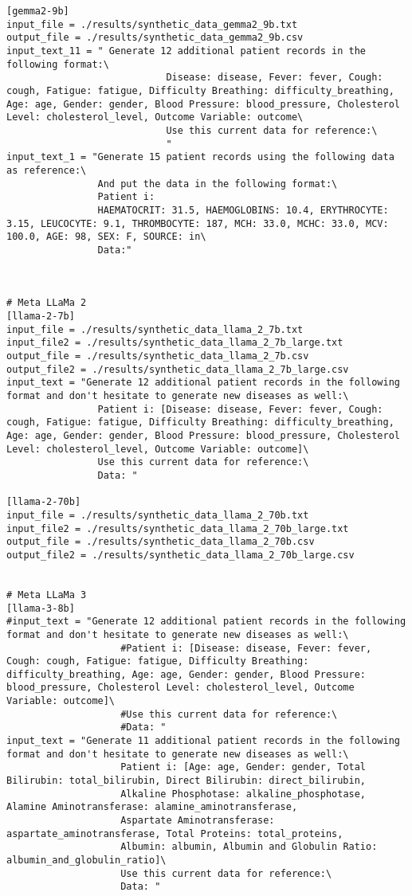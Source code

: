 \begin{verbatim}
[gemma2-9b]
input_file = ./results/synthetic_data_gemma2_9b.txt
output_file = ./results/synthetic_data_gemma2_9b.csv
input_text_11 = " Generate 12 additional patient records in the following format:\
                            Disease: disease, Fever: fever, Cough: cough, Fatigue: fatigue, Difficulty Breathing: difficulty_breathing, Age: age, Gender: gender, Blood Pressure: blood_pressure, Cholesterol Level: cholesterol_level, Outcome Variable: outcome\
                            Use this current data for reference:\
                            "
input_text_1 = "Generate 15 patient records using the following data as reference:\
                And put the data in the following format:\
                Patient i:
                HAEMATOCRIT: 31.5, HAEMOGLOBINS: 10.4, ERYTHROCYTE: 3.15, LEUCOCYTE: 9.1, THROMBOCYTE: 187, MCH: 33.0, MCHC: 33.0, MCV: 100.0, AGE: 98, SEX: F, SOURCE: in\
                Data:"



# Meta LLaMa 2
[llama-2-7b]
input_file = ./results/synthetic_data_llama_2_7b.txt
input_file2 = ./results/synthetic_data_llama_2_7b_large.txt
output_file = ./results/synthetic_data_llama_2_7b.csv
output_file2 = ./results/synthetic_data_llama_2_7b_large.csv
input_text = "Generate 12 additional patient records in the following format and don't hesitate to generate new diseases as well:\
                Patient i: [Disease: disease, Fever: fever, Cough: cough, Fatigue: fatigue, Difficulty Breathing: difficulty_breathing, Age: age, Gender: gender, Blood Pressure: blood_pressure, Cholesterol Level: cholesterol_level, Outcome Variable: outcome]\
                Use this current data for reference:\
                Data: "

[llama-2-70b]
input_file = ./results/synthetic_data_llama_2_70b.txt
input_file2 = ./results/synthetic_data_llama_2_70b_large.txt
output_file = ./results/synthetic_data_llama_2_70b.csv
output_file2 = ./results/synthetic_data_llama_2_70b_large.csv


# Meta LLaMa 3
[llama-3-8b]
#input_text = "Generate 12 additional patient records in the following format and don't hesitate to generate new diseases as well:\
                    #Patient i: [Disease: disease, Fever: fever, Cough: cough, Fatigue: fatigue, Difficulty Breathing: difficulty_breathing, Age: age, Gender: gender, Blood Pressure: blood_pressure, Cholesterol Level: cholesterol_level, Outcome Variable: outcome]\
                    #Use this current data for reference:\
                    #Data: "
input_text = "Generate 11 additional patient records in the following format and don't hesitate to generate new diseases as well:\
                    Patient i: [Age: age, Gender: gender, Total Bilirubin: total_bilirubin, Direct Bilirubin: direct_bilirubin,
                    Alkaline Phosphotase: alkaline_phosphotase, Alamine Aminotransferase: alamine_aminotransferase,
                    Aspartate Aminotransferase: aspartate_aminotransferase, Total Proteins: total_proteins,
                    Albumin: albumin, Albumin and Globulin Ratio: albumin_and_globulin_ratio]\
                    Use this current data for reference:\
                    Data: "


\end{verbatim}

